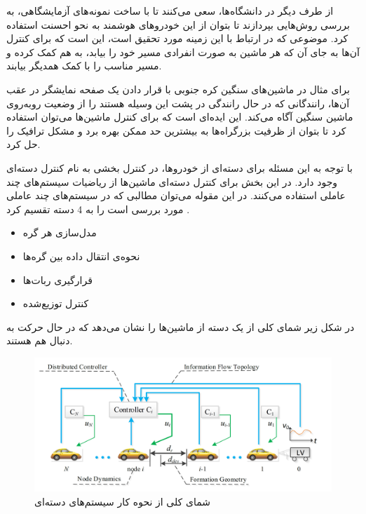 از طرف دیگر در دانشگاه‌ها، سعی می‌کنند تا با ساخت نمونه‌های آزمایشگاهی، به بررسی روش‌هایی بپردازند تا بتوان از این خودروهای هوشمند به نحو احسنت استفاده کرد. موضوعی که در ارتباط با این زمینه مورد تحقیق است، این است که برای کنترل آن‌ها به جای آن که هر ماشین به صورت انفرادی مسیر خود را بیابد، به هم کمک کرده و مسیر مناسب را با کمک همدیگر بیابند.

برای مثال در ماشین‌های سنگین کره جنوبی با قرار دادن یک صفحه نمایشگر در عقب آن‌ها، رانندگانی که در حال رانندگی در پشت این وسیله هستند را از وضعیت روبه‌روی ماشین سنگین آگاه می‌کند. این ایده‌ای است که برای کنترل ماشین‌ها می‌توان استفاده کرد تا بتوان از ظرفیت بزرگراه‌ها به بیشترین حد ممکن بهره برد و مشکل ترافیک را حل کرد.

با توجه به این مسئله برای دسته‌ای از خودروها، در کنترل بخشی به نام کنترل دسته‌ای وجود دارد. در این بخش برای کنترل دسته‌ای ماشین‌ها از ریاضیات سیستم‌های چند عاملی استفاده می‌کنند. در این مقوله می‌توان مطالبی که در سیستم‌های چند عاملی مورد بررسی است را به 4 دسته تقسیم کرد \cite{li2017platoon}.
\begin{itemize}
	\item ‌مدل‌سازی هر گره
	\item نحوه‌ی انتقال داده‌ بین گره‌ها
	\item قرارگیری ربات‌ها
	\item کنترل توزیع‌شده
\end{itemize}

در شکل زیر شمای کلی از یک دسته از ماشین‌ها را نشان می‌دهد که در حال حرکت به دنبال هم هستند.

\begin{figure}[!h] 
	\centering
	\includegraphics[scale=0.2]{Images/intro-platoon.png}
	\caption{شمای کلی از نحوه کار سیستم‌های دسته‌ای}\label{Fig intro platoon}
\end{figure}

